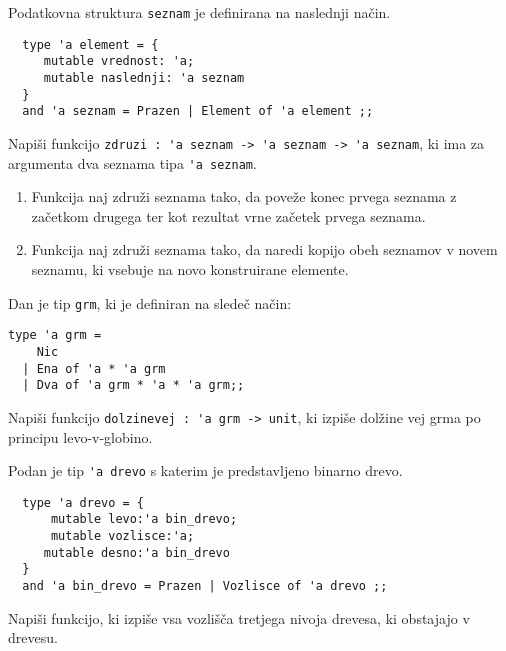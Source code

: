 \begin{ex}
  Podatkovna struktura \lstinline{seznam} je definirana na naslednji na\v
  cin.

  \begin{lstlisting}
  type 'a element = { 
     mutable vrednost: 'a; 
     mutable naslednji: 'a seznam 
  }
  and 'a seznam = Prazen | Element of 'a element ;;
  \end{lstlisting}

  Napi\v si funkcijo 
  \lstinline{zdruzi : 'a seznam -> 'a seznam -> 'a seznam}, ki ima za argumenta dva seznama tipa \lstinline{'a seznam}.

  \begin{enumerate}[label=(\roman*)]
  \item Funkcija naj zdru\v zi seznama tako, da pove\v ze konec prvega
    seznama z za\v cetkom drugega ter kot rezultat vrne za\v cetek prvega
    seznama.

  \item Funkcija naj zdru\v zi seznama tako, da naredi kopijo obeh
    seznamov v novem seznamu, ki vsebuje na novo konstruirane
    elemente.
  \end{enumerate}
\end{ex} 




\begin{ex}
  Dan je tip \lstinline{grm}, ki je definiran na slede\v c na\v cin:

\begin{lstlisting}
type 'a grm = 
    Nic 
  | Ena of 'a * 'a grm 
  | Dva of 'a grm * 'a * 'a grm;;
\end{lstlisting}

  Napi\v si funkcijo \lstinline{dolzinevej : 'a grm -> unit}, ki izpi\v
  se dol\v zine vej grma po principu levo-v-globino.
\end{ex} 




\begin{ex} 
  Podan je tip \lstinline{'a drevo} s katerim je predstavljeno binarno
  drevo.

  \begin{lstlisting}
  type 'a drevo = { 
      mutable levo:'a bin_drevo; 
      mutable vozlisce:'a; 
     mutable desno:'a bin_drevo 
  } 
  and 'a bin_drevo = Prazen | Vozlisce of 'a drevo ;;
  \end{lstlisting}

  Napi\v si funkcijo, ki izpi\v se vsa vozli\v s\v ca tretjega nivoja
  drevesa, ki obstajajo v drevesu.
\end{ex} 




